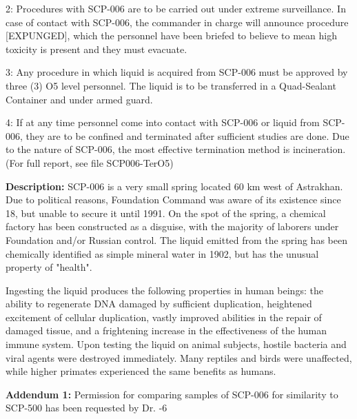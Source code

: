2: Procedures with SCP-006 are to be carried out under extreme surveillance. In case of contact with SCP-006, the commander in charge will announce procedure [EXPUNGED], which the personnel have been briefed to believe to mean high toxicity is present and they must evacuate.

3: Any procedure in which liquid is acquired from SCP-006 must be approved by three (3) O5 level personnel. The liquid is to be transferred in a Quad-Sealant Container and under armed guard.

4: If at any time personnel come into contact with SCP-006 or liquid from SCP-006, they are to be confined and terminated after sufficient studies are done. Due to the nature of SCP-006, the most effective termination method is incineration. (For full report, see file SCP006-TerO5)

\textbf{Description:} SCP-006 is a very small spring located 60 km west of Astrakhan. Due to political reasons, Foundation Command was aware of its existence since 18, but unable to secure it until 1991. On the spot of the spring, a chemical factory has been constructed as a disguise, with the majority of laborers under Foundation and/or Russian control. The liquid emitted from the spring has been chemically identified as simple mineral water in 1902, but has the unusual property of "health".

Ingesting the liquid produces the following properties in human beings: the ability to regenerate DNA damaged by sufficient duplication, heightened excitement of cellular duplication, vastly improved abilities in the repair of damaged tissue, and a frightening increase in the effectiveness of the human immune system. Upon testing the liquid on animal subjects, hostile bacteria and viral agents were destroyed immediately. Many reptiles and birds were unaffected, while higher primates experienced the same benefits as humans.

\textbf{Addendum 1:} Permission for comparing samples of SCP-006 for similarity to SCP-500 has been requested by Dr. -6
